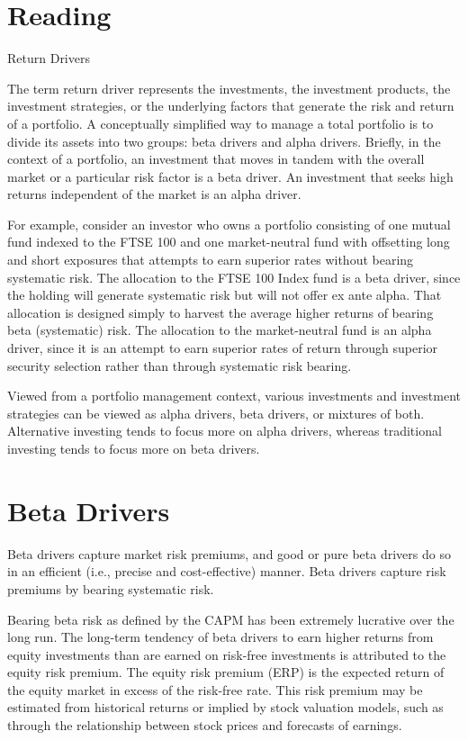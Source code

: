 \documentclass[11pt]{article}
\begin{document}
\section*{Reading}
Return Drivers

The term return driver represents the investments, the investment products, the investment strategies, or the underlying factors that generate the risk and return of a portfolio. A conceptually simplified way to manage a total portfolio is to divide its assets into two groups: beta drivers and alpha drivers. Briefly, in the context of a portfolio, an investment that moves in tandem with the overall market or a particular risk factor is a beta driver. An investment that seeks high returns independent of the market is an alpha driver.

For example, consider an investor who owns a portfolio consisting of one mutual fund indexed to the FTSE 100 and one market-neutral fund with offsetting long and short exposures that attempts to earn superior rates without bearing systematic risk. The allocation to the FTSE 100 Index fund is a beta driver, since the holding will generate systematic risk but will not offer ex ante alpha. That allocation is designed simply to harvest the average higher returns of bearing beta (systematic) risk. The allocation to the market-neutral fund is an alpha driver, since it is an attempt to earn superior rates of return through superior security selection rather than through systematic risk bearing.

Viewed from a portfolio management context, various investments and investment strategies can be viewed as alpha drivers, beta drivers, or mixtures of both. Alternative investing tends to focus more on alpha drivers, whereas traditional investing tends to focus more on beta drivers.

\section*{Beta Drivers}
Beta drivers capture market risk premiums, and good or pure beta drivers do so in an efficient (i.e., precise and cost-effective) manner. Beta drivers capture risk premiums by bearing systematic risk.

Bearing beta risk as defined by the CAPM has been extremely lucrative over the long run. The long-term tendency of beta drivers to earn higher returns from equity investments than are earned on risk-free investments is attributed to the equity risk premium. The equity risk premium (ERP) is the expected return of the equity market in excess of the risk-free rate. This risk premium may be estimated from historical returns or implied by stock valuation models, such as through the relationship between stock prices and forecasts of earnings.
\end{document}

